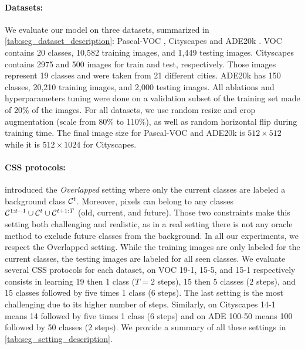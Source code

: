 \paragraph{Datasets:} We evaluate our model on three datasets, summarized in
\autoref{tab:seg_dataset_description}: Pascal-VOC \citep{everingham2015pascalvoc}, Cityscapes
\citep{cordts2016cityscapes} and ADE20k \citep{zhou2017adedataset}. VOC contains 20 classes, 10,582
training images, and 1,449 testing images. Cityscapes contains 2975 and 500 images for train and
test, respectively. Those images represent 19 classes and were taken from 21 different cities.
ADE20k has 150 classes, 20,210 training images, and 2,000 testing images. All ablations and
hyperparameters tuning were done on a validation subset of the training set made of 20\% of the
images. For all datasets, we use random resize and crop augmentation (scale from 80\% to 110\%), as
well as random horizontal flip during training time. The final image size for Pascal-VOC and ADE20k
is $512 \times 512$ while it is $512 \times 1024$ for Cityscapes.

\paragraph{CSS protocols:} \citet{cermelli2020modelingthebackground} introduced the
\textit{Overlapped} setting where only the current classes are labeled \vs a background class
$\mathcal{C}^t$. Moreover, pixels can belong to any classes $\mathcal{C}^{1:t-1} \cup \mathcal{C}^{t} \cup \mathcal{C}^{t+1:T}$
(old, current, and future). Those two constraints make this setting both challenging and realistic,
as in a real setting there is not any oracle method to exclude future classes from the background.
In all our experiments, we respect the Overlapped setting. While the training images are only
labeled for the current classes, the testing images are labeled for all seen classes. We evaluate
several \ac{CSS} protocols for each dataset, \eg on VOC 19-1, 15-5, and 15-1 respectively consists
in learning 19 then 1 class ($T=2$ steps), 15 then 5 classes ($2$ steps), and 15 classes followed by
five times 1 class ($6$ steps). The last setting is the most challenging due to its higher number of
steps. Similarly, on Cityscapes 14-1 means 14 followed by five times 1 class ($6$ steps) and on ADE
100-50 means 100 followed by 50 classes ($2$ steps). We provide a summary of all these settings in
\autoref{tab:seg_setting_description}.

